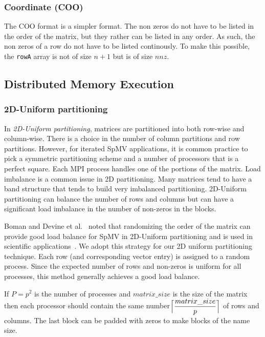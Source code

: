 \documentclass[sigconf,review,anonymous]{acmart}
\begin{document}
\subsubsection{Coordinate (COO)}

The COO format is a simpler format. The non zeros do not have to be
listed in the order of the matrix, but they rather can be listed in
any order. As such, the non zeros of a row do not have to be listed
continously. To make this possible, the \texttt{rowA} array is not of
size $n+1$ but is of size $nnz$.



\subsection{Distributed Memory Execution}


\subsubsection{2D-Uniform partitioning}

In \textit{2D-Uniform partitioning},  matrices
are partitioned into both row-wise and column-wise.  There is a choice
in the number of column partitions and row partitions. However, for
iterated SpMV applications, it is common practice to pick a symmetric
partitioning scheme and a number of processors that is a perfect
square. Each MPI process handles one of the portions of the matrix.
Load imbalance is a common issue in 2D partitioning. Many matrices
tend to have a band structure that tends to build very imbalanced
partitioning.  2D-Uniform partitioning can balance the number of rows
and columns but can have a significant load imbalance in the number
of non-zeros in the blocks.

Boman and Devine et al.~\cite{boman2013scalable} noted that
randomizing the order of the matrix can provide good load balance for
SpMV in 2D-Uniform partitioning and is used in scientific
applications~\cite{dytrych2016efficacy}. We adopt this strategy for
our 2D uniform partitioning technique. Each row (and corresponding
vector entry) is assigned to a random process.  Since the expected
number of rows and non-zeros is uniform for all processes, this method
generally achieves a good load balance.

If $P=p^2$ is the number of processes
and $matrix\_size$ is the size of the matrix then each processor
should contain the same
number$\Bigl\lceil\dfrac{matrix\_size}{p}\Bigr\rceil$ of rows and
columns. The last block can be padded with zeros to make blocks of the name size.
\end{document}
